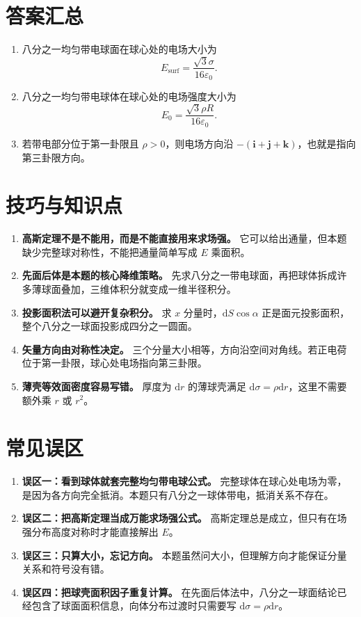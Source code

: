 \documentclass[11pt,a4paper,fontset=fandol]{ctexart}
\newcommand{\dd}{\mathrm{d}}
\newcommand{\eps}{\varepsilon_0}
\begin{document}
\section*{答案汇总}
\begin{ideaBox}
\begin{enumerate}
 \item 八分之一均匀带电球面在球心处的电场大小为
 \[
 E_{\mathrm{surf}}=\frac{\sqrt3\sigma}{16\eps}.
 \]
 \item 八分之一均匀带电球体在球心处的电场强度大小为
 \[
 E_0=\frac{\sqrt3\rho R}{16\eps}.
 \]
 \item 若带电部分位于第一卦限且 $\rho>0$，则电场方向沿 $-(\bm i+\bm j+\bm k)$，也就是指向第三卦限方向。
\end{enumerate}
\end{ideaBox}

\section*{技巧与知识点}
\begin{tipBox}
\begin{enumerate}
 \item \textbf{高斯定理不是不能用，而是不能直接用来求场强。} 它可以给出通量，但本题缺少完整球对称性，不能把通量简单写成 $E$ 乘面积。
 \item \textbf{先面后体是本题的核心降维策略。} 先求八分之一带电球面，再把球体拆成许多薄球面叠加，三维体积分就变成一维半径积分。
 \item \textbf{投影面积法可以避开复杂积分。} 求 $x$ 分量时，$\dd S\cos\alpha$ 正是面元投影面积，整个八分之一球面投影成四分之一圆面。
 \item \textbf{矢量方向由对称性决定。} 三个分量大小相等，方向沿空间对角线。若正电荷位于第一卦限，球心处电场指向第三卦限。
 \item \textbf{薄壳等效面密度容易写错。} 厚度为 $\dd r$ 的薄球壳满足 $\dd\sigma=\rho\dd r$，这里不需要额外乘 $r$ 或 $r^2$。
\end{enumerate}
\end{tipBox}

\section*{常见误区}
\begin{warnBox}
\begin{enumerate}
 \item \textbf{误区一：看到球体就套完整均匀带电球公式。} 完整球体在球心处电场为零，是因为各方向完全抵消。本题只有八分之一球体带电，抵消关系不存在。
 \item \textbf{误区二：把高斯定理当成万能求场强公式。} 高斯定理总是成立，但只有在场强分布高度对称时才能直接解出 $E$。
 \item \textbf{误区三：只算大小，忘记方向。} 本题虽然问大小，但理解方向才能保证分量关系和符号没有错。
 \item \textbf{误区四：把球壳面积因子重复计算。} 在先面后体法中，八分之一球面结论已经包含了球面面积信息，向体分布过渡时只需要写 $\dd\sigma=\rho\dd r$。
\end{enumerate}
\end{warnBox}
\end{document}
